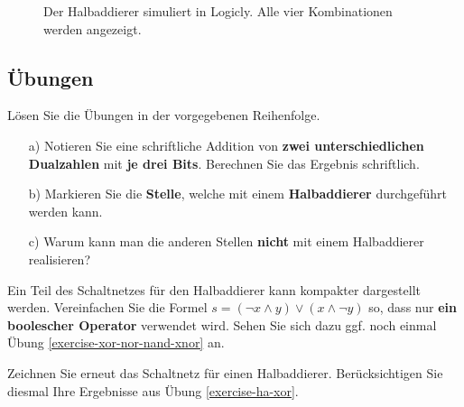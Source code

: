 \begin{figure}[H]
\begin{minipage}{0.45\textwidth}
\end{minipage}
\caption{Der Halbaddierer simuliert in Logicly. Alle vier Kombinationen werden angezeigt.}
\end{figure}

\newpage

\subsection{Übungen}

Lösen Sie die Übungen in der vorgegebenen Reihenfolge.

\begin{exercise}
\begin{enumerate}
\item[a)] Notieren Sie eine schriftliche Addition von \textbf{zwei unterschiedlichen Dualzahlen} mit \textbf{je drei Bits}. Berechnen Sie das Ergebnis schriftlich.
\fillwithgrid{1in}
\item[b)] Markieren Sie die \textbf{Stelle}, welche mit einem \textbf{Halbaddierer} durchgeführt werden kann.
\item[c)] Warum kann man die anderen Stellen \textbf{nicht} mit einem Halbaddierer realisieren?
\end{enumerate}
\end{exercise}

\begin{exercise}[subtitle={Zusatzaufgabe}]
\label{exercise-ha-xor}
Ein Teil des Schaltnetzes für den Halbaddierer kann kompakter dargestellt werden. Vereinfachen Sie die Formel $s = (\neg x \wedge y) \vee (x \wedge \neg y)$ so, dass nur \textbf{ein boolescher Operator} verwendet wird. Sehen Sie sich dazu ggf. noch einmal Übung \ref{exercise-xor-nor-nand-xnor} an.
\fillwithgrid{0.5in}
\end{exercise}

\begin{exercise}[subtitle={Zusatzaufgabe}]
Zeichnen Sie erneut das Schaltnetz für einen Halbaddierer. Berücksichtigen Sie diesmal Ihre Ergebnisse aus Übung \ref{exercise-ha-xor}.
\fillwithgrid{2in}
\end{exercise}
